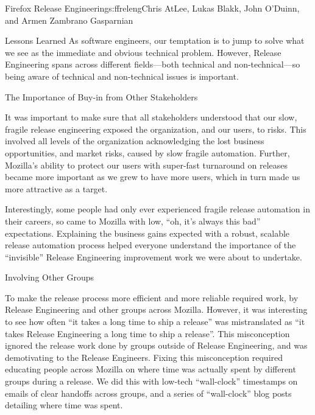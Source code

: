 \begin{aosachapter}{Firefox Release Engineering}{s:ffreleng}{Chris AtLee, Lukas Blakk, John O'Duinn, and Armen Zambrano Gasparnian}
\begin{aosasect1}{Lessons Learned}
As software engineers, our temptation is to jump to solve what we
see as the immediate and obvious technical problem. However, Release
Engineering spans across different fields---both technical and 
non-technical---so being aware of technical and non-technical issues is important.

\begin{aosasect2}{The Importance of Buy-in from Other Stakeholders}

It was important to make sure that all stakeholders understood that our
slow, fragile release engineering exposed the organization, and our users, to
risks. This involved all levels of the organization acknowledging the lost business opportunities, and market risks, caused by slow
fragile automation. Further, Mozilla's ability to
protect our users with super-fast turnaround on releases became more important
as we grew to have more users, which in turn made us more attractive as a
target.

Interestingly, some people had only ever experienced fragile release automation
in their careers, so came to Mozilla with low, ``oh, it's always this bad''
expectations. Explaining the business gains expected with a robust, scalable
release automation process helped everyone understand the importance of the
``invisible'' Release Engineering improvement work we were about to undertake.

\end{aosasect2}

\begin{aosasect2}{Involving Other Groups}

To make the release process more efficient and more reliable required work, by
Release Engineering and other groups across Mozilla. However, it was
interesting to see how often ``it takes a long time to ship a release'' was
mistranslated as ``it takes Release Engineering a long time to ship a release''.
This misconception ignored the release work done by groups outside of Release
Engineering, and was demotivating to the Release Engineers. Fixing this
misconception required educating people across Mozilla on where time was
actually spent by different groups during a release.  We did this with low-tech
``wall-clock'' timestamps on emails of clear handoffs across groups, and a series
of ``wall-clock'' blog posts detailing where time was spent.


\end{aosasect2}
\end{aosasect1}
\end{aosachapter}

